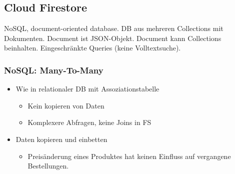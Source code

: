 \subsection{Cloud Firestore}
NoSQL, document-oriented database. DB aus mehreren Collections mit Dokumenten. Document ist JSON-Objekt. Document kann Collections beinhalten. Eingeschränkte Queries (keine Volltextsuche).

\subsubsection{NoSQL: Many-To-Many}
\begin{itemize}
    \item Wie in relationaler DB mit Assoziationstabelle
    \begin{itemize}[label={\textcolor{green}{+}}]
        \item Kein kopieren von Daten
    \end{itemize}
    \begin{itemize}[label={\textcolor{red}{--}}]
        \item Komplexere Abfragen, keine Joins in FS
    \end{itemize}
    \item Daten kopieren und einbetten
    \begin{itemize}[label={\textcolor{green}{+}}]
        \item Preisänderung eines Produktes hat keinen Einfluss auf vergangene Bestellungen.
    \end{itemize}
\end{itemize}
